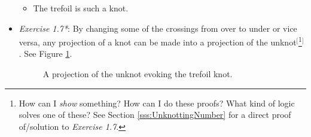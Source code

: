 \documentclass[titlepage]{article}
\numberwithin{figure}{section}
\numberwithin{table}{section}
\numberwithin{equation}{section}
\begin{document}
\begin{itemize}
\begin{itemize}
        \item The trefoil is such a knot.
    \end{itemize}
    \item \emph{Exercise 1.7*}: By changing some of the crossings from over to under or vice versa, any projection of a knot can be made into a projection of the unknot$^[$\footnote{How can I \emph{show} something? How can I do these proofs? What kind of logic solves one of these? See Section \ref{sss:UnknottingNumber} for a direct proof of/solution to \emph{Exercise 1.7}.}$^]$. See Figure \ref{fig:knottotrivial}.
    \begin{figure}[h!]
        \centering
        \caption{A projection of the unknot evoking the trefoil knot.}
        \label{fig:knottotrivial}
    \end{figure}
\end{itemize}
\end{document}
